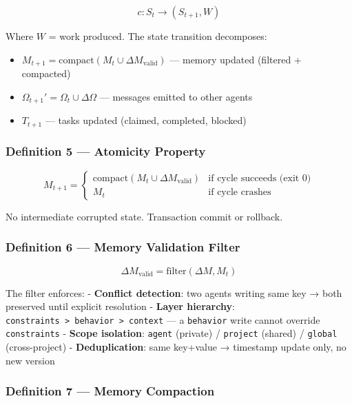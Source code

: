 \documentclass[11pt]{article}
\providecommand{\tightlist}{%
      \setlength{\itemsep}{0pt}\setlength{\parskip}{0pt}}
\begin{document}
\[c : S_t \rightarrow (S_{t+1}, W)\]

Where \(W\) = work produced. The state transition decomposes:

\begin{itemize}
\tightlist
\item
  \(M_{t+1} = \text{compact}(M_t \cup \Delta M_{\text{valid}})\) ---
  memory updated (filtered + compacted)
\item
  \(\Omega_{t+1}' = \Omega_t \cup \Delta \Omega\) --- messages emitted
  to other agents
\item
  \(T_{t+1}\) --- tasks updated (claimed, completed, blocked)
\end{itemize}

\subsubsection{Definition 5 --- Atomicity
Property}\label{definition-5-atomicity-property}

\[M_{t+1} = \begin{cases} \text{compact}(M_t \cup \Delta M_{\text{valid}}) & \text{if cycle succeeds (exit 0)} \\ M_t & \text{if cycle crashes} \end{cases}\]

No intermediate corrupted state. Transaction commit or rollback.

\subsubsection{Definition 6 --- Memory Validation
Filter}\label{definition-6-memory-validation-filter}

\[\Delta M_{\text{valid}} = \text{filter}(\Delta M, M_t)\]

The filter enforces: - \textbf{Conflict detection}: two agents writing
same key → both preserved until explicit resolution - \textbf{Layer
hierarchy}:
\texttt{constraints\ \textgreater{}\ behavior\ \textgreater{}\ context}
--- a \texttt{behavior} write cannot override \texttt{constraints} -
\textbf{Scope isolation}: \texttt{agent} (private) / \texttt{project}
(shared) / \texttt{global} (cross-project) - \textbf{Deduplication}:
same key+value → timestamp update only, no new version

\subsubsection{Definition 7 --- Memory
Compaction}\label{definition-7-memory-compaction}
\end{document}
